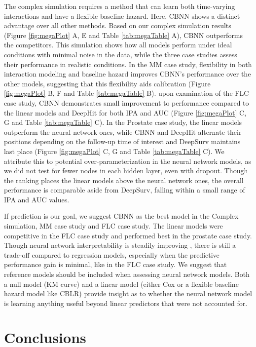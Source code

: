 \documentclass[APA,LATO1COL]{WileyNJD-v2}
\begin{document}
The complex simulation requires a method that can learn both time-varying
interactions and have a flexible baseline hazard. Here, CBNN shows
a distinct advantage over all other methods. Based on our complex simulation results (Figure
\ref{fig:megaPlot} A, E and Table \ref{tab:megaTable} A), CBNN
outperforms the competitors. This simulation shows how all models perform
under ideal conditions with minimal noise in the data, while the three case studies
assess their performance in realistic conditions. In the MM case study, flexibility in both
interaction modeling and baseline hazard improves CBNN's performance over
the other models, suggesting that this flexibility aids calibration (Figure
\ref{fig:megaPlot} B, F and Table \ref{tab:megaTable} B). upon examination of the FLC case study,
CBNN demonstrates small improvement to performance compared to the linear models and DeepHit
for both IPA and AUC (Figure \ref{fig:megaPlot} C, G and Table \ref{tab:megaTable} C).
In the Prostate case study, the linear models outperform
the neural network ones, while CBNN and DeepHit alternate their positions depending
on the follow-up time of interest and DeepSurv maintains last place
(Figure \ref{fig:megaPlot} C, G and Table \ref{tab:megaTable} C). We attribute this to
potential over-parameterization in the neural network models, as we did not test for fewer
nodes in each hidden layer, even with dropout. Though the
ranking places the linear models above the neural network ones, the overall
performance is comparable aside from DeepSurv, falling within a small range of IPA and AUC values.

If prediction is our goal, we suggest CBNN as the best model in the Complex simulation, MM case study
and FLC case study. The linear models were competitive in the FLC case study and performed best
in the prostate case study. Though neural network interpretability is steadily improving \citep{interpret},
there is still a trade-off compared to regression models, especially
when the predictive performance gain is minimal, like in the FLC case study. We suggest that reference models should be included
when assessing neural network models. Both a null model (KM curve) and a linear model (either Cox or
a flexible baseline hazard model like CBLR) provide insight as to whether the neural network model is learning
anything useful beyond linear predictors that were not accounted for.

\section{Conclusions}\label{sec5}
\end{document}
